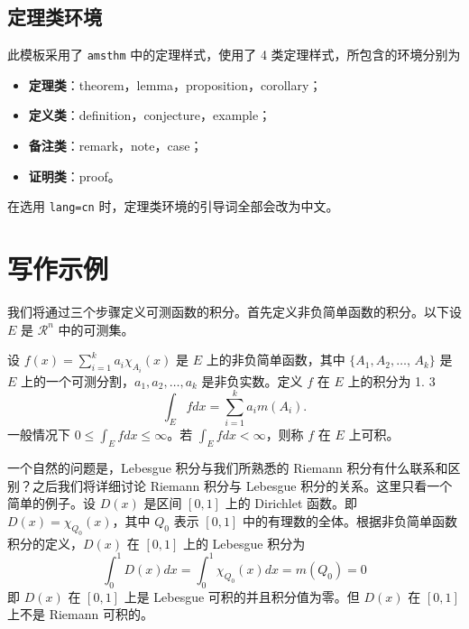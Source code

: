 \subsection{定理类环境}

此模板采用了 \lstinline{amsthm} 中的定理样式，使用了 4 类定理样式，所包含的环境分别为
\begin{itemize}
  \item \textbf{定理类}：theorem，lemma，proposition，corollary；
  \item \textbf{定义类}：definition，conjecture，example；
  \item \textbf{备注类}：remark，note，case；
  \item \textbf{证明类}：proof。
\end{itemize}

\begin{remark}
在选用 \lstinline{lang=cn} 时，定理类环境的引导词全部会改为中文。
\end{remark}


\section{写作示例}

我们将通过三个步骤定义可测函数的积分。首先定义非负简单函数的积分。以下设 $E$ 是 $\mathcal{R}^n$ 中的可测集。

\begin{definition}[可积性]
设 $ f(x)=\sum\limits_{i=1}^{k} a_i \chi_{A_i}(x)$ 是 $E$ 上的非负简单函数，其中 $\{A_1,A_2,\ldots$, $A_k\}$ 是 $E$ 上的一个可测分割，$a_1,a_2,\ldots,a_k$ 是非负实数。定义 $f$ 在 $E$ 上的积分为 1. 3
\begin{equation}
   \label{inter}
   \int_{E} f dx = \sum_{i=1}^k a_i m(A_i).
\end{equation}
一般情况下 $0 \leq \int_{E} f dx \leq \infty$。若 $\int_{E} f dx < \infty$，则称 $f$ 在 $E$ 上可积。
\end{definition}

一个自然的问题是，Lebesgue 积分与我们所熟悉的 Riemann 积分有什么联系和区别？之后我们将详细讨论 Riemann 积分与 Lebesgue 积分的关系。这里只看一个简单的例子。设 $D(x)$ 是区间 $[0,1]$ 上的 Dirichlet 函数。即 $D(x)=\chi_{Q_0}(x)$，其中 $Q_0$ 表示 $[0,1]$ 中的有理数的全体。根据非负简单函数积分的定义，$D(x)$ 在 $[0,1]$ 上的 Lebesgue 积分为
\begin{equation}\label{inter2}
  \int_0^1 D(x)dx = \int_0^1 \chi_{Q_0} (x) dx = m(Q_0) = 0
\end{equation}
即 $D(x)$ 在 $[0,1]$ 上是 Lebesgue 可积的并且积分值为零。但 $D(x)$ 在 $[0,1]$ 上不是 Riemann 可积的。

